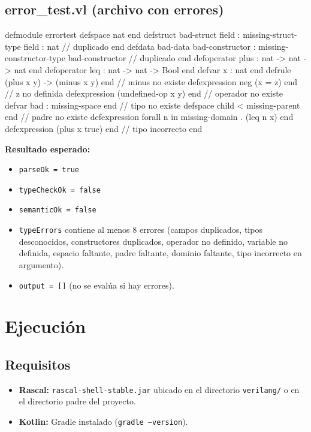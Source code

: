 \documentclass[12pt]{article}
\newcommand{\code}[1]{\texttt{#1}}
\begin{document}
\subsection{error\_test.vl (archivo con errores)}

\begin{rascal}
defmodule errortest
defspace nat end
defstruct bad-struct
  field : missing-struct-type
  field : nat        // duplicado
end
defdata bad-data
  bad-constructor : missing-constructor-type
  bad-constructor   // duplicado
end
defoperator plus : nat -> nat -> nat end
defoperator leq : nat -> nat -> Bool end
defvar x : nat end
defrule (plus x y) -> (minus x y) end  // minus no existe
defexpression neg (x = z) end           // z no definida
defexpression (undefined-op x y) end    // operador no existe
defvar bad : missing-space end          // tipo no existe
defspace child < missing-parent end     // padre no existe
defexpression forall n in missing-domain . (leq n x) end
defexpression (plus x true) end         // tipo incorrecto
end
\end{rascal}

\textbf{Resultado esperado:}
\begin{itemize}
  \item \code{parseOk = true}
  \item \code{typeCheckOk = false}
  \item \code{semanticOk = false}
  \item \code{typeErrors} contiene al menos 8 errores (campos duplicados,
        tipos desconocidos, constructores duplicados, operador no definido,
        variable no definida, espacio faltante, padre faltante, dominio
        faltante, tipo incorrecto en argumento).
  \item \code{output = []} (no se evalúa si hay errores).
\end{itemize}

\section{Ejecución}

\subsection{Requisitos}

\begin{itemize}
  \item \textbf{Rascal:} \code{rascal-shell-stable.jar} ubicado en el
        directorio \code{verilang/} o en el directorio padre del proyecto.
  \item \textbf{Kotlin:} Gradle instalado (\code{gradle --version}).
\end{itemize}
\end{document}
